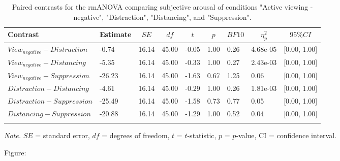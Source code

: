 \documentclass[
  english,
  man,floatsintext]{apa6}
\begin{document}
\begin{table}[H]

\begin{center}
\begin{threeparttable}

\caption{\label{tab:unnamed-chunk-4}Paired contrasts for the rmANOVA comparing subjective arousal of conditions "Active viewing - negative", "Distraction", "Distancing", and "Suppression".}

\begin{tabular}{lllllllll}
\toprule
Contrast & \multicolumn{1}{c}{Estimate} & \multicolumn{1}{c}{$SE$} & \multicolumn{1}{c}{$df$} & \multicolumn{1}{c}{$t$} & \multicolumn{1}{c}{$p$} & \multicolumn{1}{c}{$BF10$} & \multicolumn{1}{c}{$\eta_{p}^{2}$} & \multicolumn{1}{c}{$95\% CI$}\\
\midrule
$View_{negative} - Distraction$ & -0.74 & 16.14 & 45.00 & -0.05 & 1.00 & 0.26 & 4.68e-05 & {}[0.00, 1.00]\\
$View_{negative} - Distancing$ & -5.35 & 16.14 & 45.00 & -0.33 & 1.00 & 0.27 & 2.43e-03 & {}[0.00, 1.00]\\
$View_{negative} - Suppression$ & -26.23 & 16.14 & 45.00 & -1.63 & 0.67 & 1.25 & 0.06 & {}[0.00, 1.00]\\
$Distraction - Distancing$ & -4.61 & 16.14 & 45.00 & -0.29 & 1.00 & 0.26 & 1.81e-03 & {}[0.00, 1.00]\\
$Distraction - Suppression$ & -25.49 & 16.14 & 45.00 & -1.58 & 0.73 & 0.77 & 0.05 & {}[0.00, 1.00]\\
$Distancing - Suppression$ & -20.88 & 16.14 & 45.00 & -1.29 & 1.00 & 0.52 & 0.04 & {}[0.00, 1.00]\\
\bottomrule
\addlinespace
\end{tabular}

\begin{tablenotes}[para]
\normalsize{\textit{Note.} $SE$ = standard error, $df$ = degrees of freedom, $t$ = $t$-statistic, $p$ = $p$-value, CI = confidence interval.}
\end{tablenotes}

\end{threeparttable}
\end{center}

\end{table}

Figure:
\end{document}

